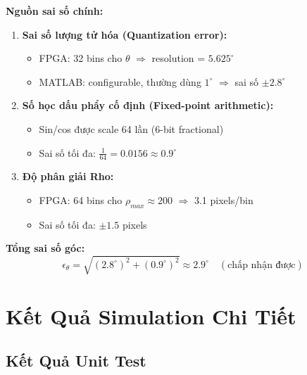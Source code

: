 \documentclass[12pt,a4paper]{article}
\begin{document}
\textbf{Nguồn sai số chính:}
\begin{enumerate}
    \item \textbf{Sai số lượng tử hóa (Quantization error):} 
    \begin{itemize}
        \item FPGA: 32 bins cho $\theta$ $\Rightarrow$ resolution = $5.625^\circ$
        \item MATLAB: configurable, thường dùng $1^\circ$ $\Rightarrow$ sai số $\pm 2.8^\circ$
    \end{itemize}
    
    \item \textbf{Số học dấu phẩy cố định (Fixed-point arithmetic):}
    \begin{itemize}
        \item Sin/cos được scale 64 lần (6-bit fractional)
        \item Sai số tối đa: $\frac{1}{64} = 0.0156 \approx 0.9^\circ$
    \end{itemize}
    
    \item \textbf{Độ phân giải Rho:}
    \begin{itemize}
        \item FPGA: 64 bins cho $\rho_{max} \approx 200$ $\Rightarrow$ 3.1 pixels/bin
        \item Sai số tối đa: $\pm 1.5$ pixels
    \end{itemize}
\end{enumerate}

\textbf{Tổng sai số góc:}
\begin{equation}
    \epsilon_\theta = \sqrt{(2.8^\circ)^2 + (0.9^\circ)^2} \approx 2.9^\circ \quad (\text{chấp nhận được})
\end{equation}

\section{Kết Quả Simulation Chi Tiết}

\subsection{Kết Quả Unit Test}
\end{document}
